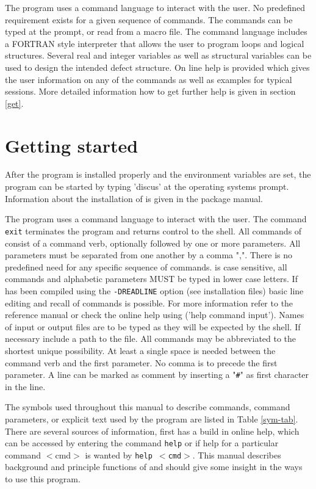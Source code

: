 The program uses a command language to interact with the user. No
predefined requirement exists for a given sequence of commands. The
commands can be typed at the \Discus prompt, or read from a
macro file. The command language includes a FORTRAN style
interpreter that allows the user to program loops and logical
structures. Several real and integer variables as well as structural
variables can be used to design the intended defect structure. On
line help is provided which gives the user information on any of the
\Discus commands as well as examples for typical \Discus
sessions. More detailed information how to get further help is given
in section \ref{get}.


\section{Getting started \label{get}}

After the program \Discus is installed properly and the environment
variables are set, the program can be started by typing 'discus' at the
operating systems prompt. Information about the installation of \Discus
is given in the \Discus package manual.

The program uses a command language to interact with the user.  The
command {\tt exit} terminates the program and returns control to the
shell.  All commands of \Discus consist of a command verb,
optionally followed by one or more parameters.  All parameters must
be separated from one another by a comma ",".  There is no
predefined need for any specific sequence of commands.  \Discus
is case sensitive, all commands and alphabetic parameters MUST be
typed in lower case letters.  If \Discus has been compiled
using the {\tt -DREADLINE} option (see installation files) basic
line editing and recall of commands is possible.  For more
information refer to the reference manual or check the online help
using ('help command input').  Names of input or output files are to
be typed as they will be expected by the shell.  If necessary
include a path to the file.  All commands may be abbreviated to the
shortest unique possibility. At least a single space is needed
between the command verb and the first parameter.  No comma is to
precede the first parameter. A line can be marked as comment by
inserting a "{\tt \#}" as first character in the line.\par

The symbols used throughout this manual to describe commands,
command parameters, or explicit text used by the program \Discus 
are listed in Table \ref{sym-tab}. There are several sources
of information, first \Discus has a build in online help, which
can be accessed by entering the command {\tt help} or if help for a
particular command $<$cmd$>$ is wanted by {\tt help $<$cmd$>$}. This
manual describes background and principle functions of \Discus
and should give some insight in the ways to use this program. \par

